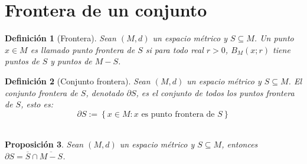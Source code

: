 \documentclass[oneside]{book} %
\theoremstyle{Teorema}
\newtheorem{Definicion}{Definición}[chapter]
\newtheorem{Proposicion}[Definicion]{Proposición}
\theoremstyle{Ejemplos}
\theoremstyle{[Obs]}
\renewcommand{\{}{\left\lbrace} %
\renewcommand{\}}{\right\rbrace} %
\newcommand{\n}{\cap} %
\renewcommand{\sc}{\subseteq} %
\begin{document}
		\section{Frontera de un conjunto}	

			\begin{Definicion}[Frontera]
				
				Sean $(M, d)$ un espacio métrico y $S \sc M$. Un punto $x \in M$ es llamado punto frontera de $S$ si para todo real $r > 0$, $B_{M}(x;r)$ tiene puntos de $S$ y puntos de $M - S$. \\

			\end{Definicion}

			\begin{Definicion}[Conjunto frontera]

				Sean $(M, d)$ un espacio métrico y $S \sc M$. El conjunto frontera de $S$, denotado $\partial S$, es el conjunto de todos los puntos frontera de $S$, esto es: \\
				
				\[ \partial S := \{ x \in M : x \text{ es punto frontera de } S \} \] \\

			\end{Definicion}

			\begin{Proposicion}
				
				Sean $(M, d)$ un espacio métrico y $S \sc M$, entonces $\partial S = \overline{S} \n \overline{M - S}$. \\

			\end{Proposicion}
\end{document}

